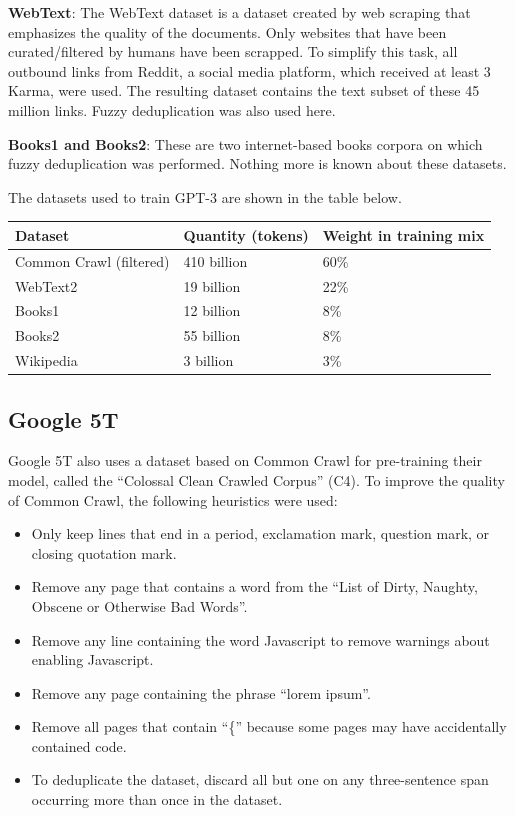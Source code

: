 \documentclass[]{krantz}
\providecommand{\tightlist}{%
  \setlength{\itemsep}{0pt}\setlength{\parskip}{0pt}}
\begin{document}
\textbf{WebText}: The WebText dataset is a dataset created by web scraping that emphasizes the quality of the documents. Only websites that have been curated/filtered by humans have been scrapped. To simplify this task, all outbound links from Reddit, a social media platform, which received at least 3 Karma, were used. The resulting dataset contains the text subset of these 45 million links. Fuzzy deduplication was also used here.

\textbf{Books1 and Books2}: These are two internet-based books corpora on which fuzzy deduplication was performed. Nothing more is known about these datasets.

The datasets used to train GPT-3 are shown in the table below.

\begin{tabular}{l|l|l}
\hline
Dataset & Quantity (tokens) & Weight in training mix\\
\hline
Common Crawl (filtered) & 410 billion & 60\%\\
\hline
WebText2 & 19 billion & 22\%\\
\hline
Books1 & 12 billion & 8\%\\
\hline
Books2 & 55 billion & 8\%\\
\hline
Wikipedia & 3 billion & 3\%\\
\hline
\end{tabular}

\citep{brown2020language}

\hypertarget{google-5t}{%
\subsection{Google 5T}\label{google-5t}}

Google 5T also uses a dataset based on Common Crawl for pre-training their model, called the ``Colossal Clean Crawled Corpus'' (C4). To improve the quality of Common Crawl, the following heuristics were used:

\begin{itemize}
\tightlist
\item
  Only keep lines that end in a period, exclamation mark, question mark, or closing quotation mark.
\item
  Remove any page that contains a word from the ``List of Dirty, Naughty, Obscene or Otherwise Bad Words''.
\item
  Remove any line containing the word Javascript to remove warnings about enabling Javascript.
\item
  Remove any page containing the phrase ``lorem ipsum''.
\item
  Remove all pages that contain ``\{'' because some pages may have accidentally contained code.
\item
  To deduplicate the dataset, discard all but one on any three-sentence span occurring more than once in the dataset.
\end{itemize}
\end{document}
